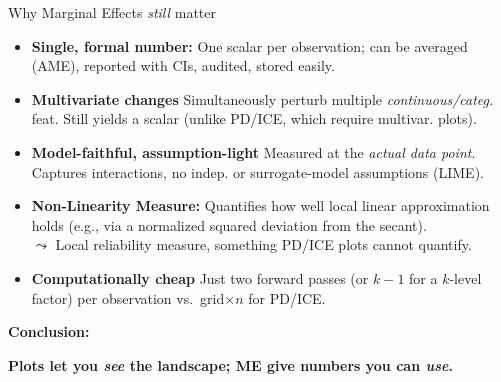 \documentclass[10pt,compress,t,notes=noshow, xcolor=table]{beamer}
\begin{document}
\begin{frame}{Why Marginal Effects \emph{still} matter}

\begin{itemize}\setlength\itemsep{0.55em}
\item \textbf{Single, formal number:} One \alert{scalar} per observation; can be averaged (AME), reported with CIs, audited, stored easily.

\item \textbf{Multivariate changes}  
      Simultaneously perturb multiple \emph{continuous/categ.} feat.
       Still yields a scalar (unlike PD/ICE, which require multivar. plots).

\item \textbf{Model-faithful, assumption-light}  
      Measured at the \emph{actual data point}.
      Captures interactions, no indep. or surrogate-model assumptions (LIME).

\item \textbf{Non-Linearity Measure:}  
Quantifies how well local linear approximation holds (e.g., via a normalized squared deviation from the secant). \\
$\leadsto$ Local reliability measure, something PD/ICE plots cannot quantify.
\item \textbf{Computationally cheap}  
      Just two forward passes (or \(k\!-\!1\) for a \(k\)-level factor) per observation vs.\ grid\(\times n\) for PD/ICE.

\end{itemize}

\vspace{0.3em}
\textbf{Conclusion:} 
\begin{center}
\textbf{Plots let you \emph{see} the landscape;\quad  
ME give numbers you can \emph{use}.}
\end{center}

\end{frame}
\end{document}
